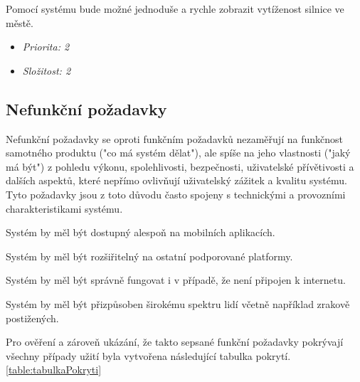 Pomocí systému bude možné jednoduše a rychle zobrazit vytíženost silnice ve městě.

\begin{itemize}
  \item \textit{Priorita: 2}
  \item \textit{Složitost: 2}
\end{itemize}

\subsection{Nefunkční požadavky}
Nefunkční požadavky se oproti funkčním požadavků nezaměřují na funkčnost samotného produktu ("co má systém dělat"),
ale spíše na jeho vlastnosti ("jaký má být") z pohledu
výkonu, spolehlivosti, bezpečnosti, uživatelské přívětivosti a dalších aspektů, které nepřímo ovlivňují uživatelský zážitek a kvalitu systému. 
Tyto požadavky jsou z toto důvodu často spojeny s technickými a provozními charakteristikami systému.

Systém by měl být dostupný alespoň na mobilních aplikacích.



Systém by měl být rozšiřitelný na ostatní podporované platformy. %

Systém by měl být správně fungovat i v případě, že není připojen k internetu.

Systém by měl být přizpůsoben širokému spektru lidí včetně například zrakově postižených.


Pro ověření a zároveň ukázání, že takto sepsané funkční požadavky pokrývají všechny případy užití 
byla vytvořena následující tabulka pokrytí. \ref{table:tabulkaPokryti}

